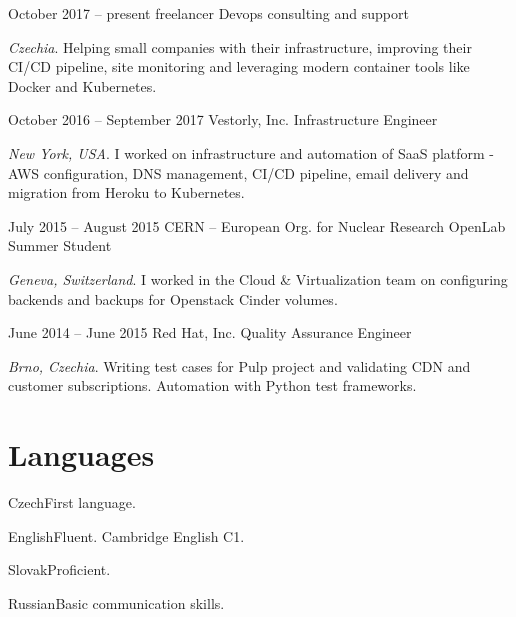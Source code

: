 \documentclass{tccv}
\begin{document}
\begin{eventlist}

\item{October 2017 -- present}
{freelancer}
{Devops consulting and support}

\emph{Czechia}. Helping small companies with their infrastructure, improving their CI/CD pipeline, site monitoring and leveraging modern container tools like Docker and Kubernetes.

\item{October 2016 -- September 2017}
{Vestorly, Inc.}
{Infrastructure Engineer}

\emph{New York, USA}. I worked on infrastructure and automation of SaaS platform - AWS configuration, DNS management, CI/CD pipeline, email delivery and migration from Heroku to Kubernetes.

\item{July 2015 -- August 2015}
     {CERN -- European Org. for Nuclear Research}
     {OpenLab Summer Student}

\emph{Geneva, Switzerland}. I worked in the Cloud \& Virtualization team on configuring backends and backups for Openstack Cinder volumes.


\item{June 2014 -- June 2015}
     {Red Hat, Inc.}
     {Quality Assurance Engineer}

\emph{Brno, Czechia}. Writing test cases for Pulp project and validating CDN and customer subscriptions. Automation with Python test frameworks.

%
%
%

\end{eventlist}

\section{Languages}

\begin{factlist}
	\item{Czech}{First language.}
	\item{English}{Fluent. Cambridge English C1.}
	\item{Slovak}{Proficient.}
	\item{Russian}{Basic communication skills.}
\end{factlist}
\end{document}
